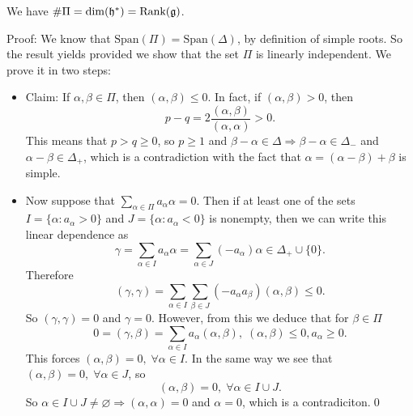 \begin{dang}
    \begin{lemma}
        We have $\#\Pi=\dim(\mathfrak{h}^*)=\text{Rank}(\mathfrak{g})$.
    \end{lemma}
\end{dang}
Proof: We know that $\text{Span}(\Pi)=\text{Span}(\Delta)$, by definition of simple roots. So the result yields provided
we show that the set $\Pi$ is linearly independent. We prove it in two steps:
\begin{itemize}
    \item Claim: If $\alpha,\beta\in\Pi$, then $(\alpha,\beta)\leq0$. In fact, if $(\alpha,\beta)>0$, then 
    \begin{equation}
        p-q=2\frac{(\alpha,\beta)}{(\alpha,\alpha)}>0.
    \end{equation}
    This means that $p>q\geq0$, so $p\geq1$ and $\beta-\alpha\in\Delta\Rightarrow \beta-\alpha\in\Delta_-$ and 
    $\alpha-\beta\in\Delta_+$, which is a contradiction with the fact that $\alpha=(\alpha-\beta)+\beta$ is simple.

    \item Now suppose that $\sum_{\alpha\in\Pi}a_\alpha\alpha=0$. Then if at least one of the sets  
    $I=\{\alpha:a_\alpha>0\}$ and 
    $J=\{\alpha:a_\alpha<0\}$ is nonempty, then we can write this linear dependence as 
    \begin{equation}
       \gamma= \sum_{\alpha\in I}a_\alpha\alpha = \sum_{\alpha\in J}(-a_\alpha)\alpha \in \Delta_+\cup\{0\}.
    \end{equation}
    Therefore 
    \begin{equation}
            (\gamma,\gamma)=\sum_{\alpha\in I}\sum_{\beta\in J}(-a_\alpha a_\beta)(\alpha,\beta)\leq0.
    \end{equation}
    So $(\gamma,\gamma)=0$ and $\gamma=0$. However, from this we deduce that for $\beta\in\Pi$ 
    \begin{equation}
        0=(\gamma,\beta)=\sum_{\alpha\in I}a_\alpha(\alpha,\beta),\; (\alpha,\beta)\leq0, a_\alpha\geq0.
    \end{equation}
    This forces $(\alpha,\beta)=0,\;\forall \alpha\in I$. In the same way we see that 
    $(\alpha,\beta)=0,\;\forall \alpha\in J$, so 
    \begin{equation}
              (\alpha,\beta)=0,\;\forall\alpha\in I\cup J.   
    \end{equation}
    So $\alpha\in I\cup J \neq \varnothing\Rightarrow (\alpha,\alpha)=0$ and $\alpha=0$, which is a contradiciton.\qed
\end{itemize}


